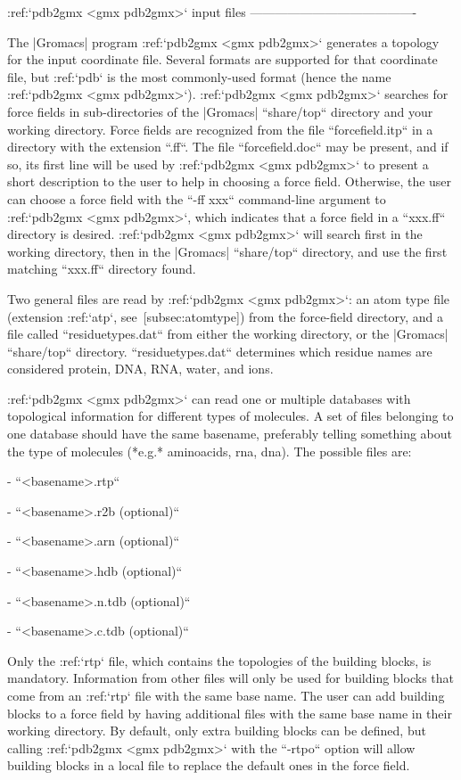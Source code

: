 :ref:`pdb2gmx <gmx pdb2gmx>` input files
----------------------------------------

The |Gromacs| program :ref:`pdb2gmx <gmx pdb2gmx>` generates a topology for the input
coordinate file. Several formats are supported for that coordinate file,
but :ref:`pdb` is the most commonly-used format (hence the name :ref:`pdb2gmx <gmx pdb2gmx>`).
:ref:`pdb2gmx <gmx pdb2gmx>` searches for force fields in sub-directories of the |Gromacs|
``share/top`` directory and your working directory. Force fields are
recognized from the file ``forcefield.itp`` in a directory with the
extension ``.ff``. The file ``forcefield.doc`` may be present, and if so, its
first line will be used by :ref:`pdb2gmx <gmx pdb2gmx>` to present a short description to the
user to help in choosing a force field. Otherwise, the user can choose a
force field with the ``-ff xxx`` command-line argument to :ref:`pdb2gmx <gmx pdb2gmx>`, which
indicates that a force field in a ``xxx.ff`` directory is desired. :ref:`pdb2gmx <gmx pdb2gmx>`
will search first in the working directory, then in the |Gromacs|
``share/top`` directory, and use the first matching ``xxx.ff`` directory found.

Two general files are read by :ref:`pdb2gmx <gmx pdb2gmx>`: an atom type file (extension
:ref:`atp`, see [subsec:atomtype]) from the force-field directory, and a file
called ``residuetypes.dat`` from either the working directory, or the
|Gromacs| ``share/top`` directory. ``residuetypes.dat`` determines which residue
names are considered protein, DNA, RNA, water, and ions.

:ref:`pdb2gmx <gmx pdb2gmx>` can read one or multiple databases with topological information
for different types of molecules. A set of files belonging to one
database should have the same basename, preferably telling something
about the type of molecules (*e.g.* aminoacids, rna, dna). The possible
files are:

-  ``<basename>.rtp``

-  ``<basename>.r2b (optional)``

-  ``<basename>.arn (optional)``

-  ``<basename>.hdb (optional)``

-  ``<basename>.n.tdb (optional)``

-  ``<basename>.c.tdb (optional)``

Only the :ref:`rtp` file, which contains the topologies of the building
blocks, is mandatory. Information from other files will only be used for
building blocks that come from an :ref:`rtp` file with the same base name. The
user can add building blocks to a force field by having additional files
with the same base name in their working directory. By default, only
extra building blocks can be defined, but calling :ref:`pdb2gmx <gmx pdb2gmx>` with the ``-rtpo``
option will allow building blocks in a local file to replace the default
ones in the force field.

